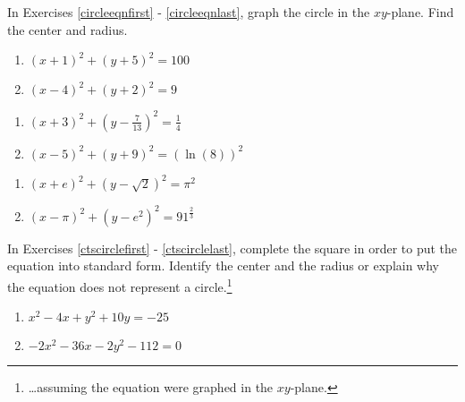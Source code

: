 \label{ExercisesforCircles}

In Exercises \ref{circleeqnfirst} - \ref{circleeqnlast}, graph the circle in the $xy$-plane.  Find the center and radius.

\begin{multicols}{2}
\begin{enumerate}

\item $(x + 1)^{2} + (y + 5)^{2} = 100$ \label{circleeqnfirst} \label{oddcircleone}
\item $(x-4)^2+(y+2)^2 = 9$

\setcounter{HW}{\value{enumi}}
\end{enumerate}
\end{multicols}

\begin{multicols}{2}
\begin{enumerate}
\setcounter{enumi}{\value{HW}}

\item $\left(x + 3\right)^{2} + \left(y - \frac{7}{13}\right)^{2} = \frac{1}{4}$ \label{oddcirclethree}

\item $(x - 5)^{2} + (y + 9)^{2} = (\ln(8))^{2}$


\setcounter{HW}{\value{enumi}}
\end{enumerate}
\end{multicols}

\begin{multicols}{2}
\begin{enumerate}
\setcounter{enumi}{\value{HW}}


\item $(x  + e)^{2} + \left(y - \sqrt{2} \right)^{2} = \pi^{2}$  \label{oddcirclefive}

\item $\left(x - \pi \right)^{2} + \left(y -  e^{2}\right)^{2} = 91^{\frac{2}{3}}$ \label{circleeqnlast}

\setcounter{HW}{\value{enumi}}
\end{enumerate}
\end{multicols}


In Exercises \ref{ctscirclefirst} - \ref{ctscirclelast}, complete the square in order to put the equation into standard form.  Identify the center and the radius or explain why the equation does not represent a circle.\footnote{\ldots assuming the equation were graphed in the $xy$-plane.}


\begin{multicols}{2}
\begin{enumerate}
\setcounter{enumi}{\value{HW}}

\item $x^{2} - 4x + y^{2} + 10y = -25$  \label{ctscirclefirst}  \label{oddcircleseven}
\item $-2x^{2} - 36x - 2y^{2} - 112 = 0$

\setcounter{HW}{\value{enumi}}
\end{enumerate}
\end{multicols}

